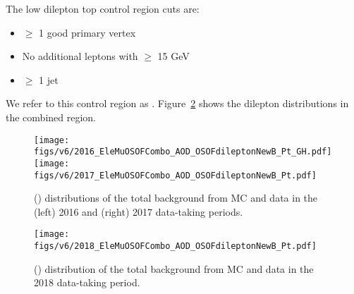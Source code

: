 %
The low dilepton \pt top control region cuts are:
\begin{itemize}
  \item $\geq$ 1 good primary vertex
  \item No additional leptons with \pt $\geq$ 15 GeV
  \item $\geq$ 1 jet
\end{itemize}
We refer to this control region as \textbf{\elemuall}.
Figure~\ref{fig:zptelmu} shows the dilepton \pt distributions in the combined \elemuall
region.

\begin{figure}[h!]
  \caption{\elemuall \pt(\dilepton) distributions of the total background from MC and data
  in the (left) 2016 and (right) 2017 data-taking periods.}
  \label{fig:zptelmu}
  \centering
  \texttt{[image: figs/v6/2016\_EleMuOSOFCombo\_AOD\_OSOFdileptonNewB\_Pt\_GH.pdf]}
  \texttt{[image: figs/v6/2017\_EleMuOSOFCombo\_AOD\_OSOFdileptonNewB\_Pt.pdf]}
\end{figure}

\begin{figure}[h!]
  \caption{\elemuall \pt(\dilepton) distribution of the total background from MC and data
  in the 2018 data-taking period.}
  \label{fig:zptelmu}
  \centering
  \texttt{[image: figs/v6/2018\_EleMuOSOFCombo\_AOD\_OSOFdileptonNewB\_Pt.pdf]}
\end{figure}

